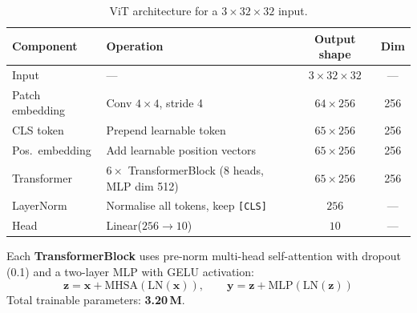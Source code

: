 \documentclass[11pt,a4paper]{article}
\begin{document}
\begin{table}[H]
\centering
\caption{ViT architecture for a $3\times32\times32$ input.}
\label{tab:vit_arch}
\begin{tabular}{llcc}
\toprule
\textbf{Component} & \textbf{Operation} & \textbf{Output shape} & \textbf{Dim} \\
\midrule
Input            & ---                                   & $3\times32\times32$ & --- \\
Patch embedding  & Conv $4\times4$, stride 4             & $64\times256$       & 256 \\
CLS token        & Prepend learnable token               & $65\times256$       & 256 \\
Pos.\ embedding  & Add learnable position vectors        & $65\times256$       & 256 \\
Transformer      & $6\times$ TransformerBlock (8 heads, MLP dim 512) & $65\times256$ & 256 \\
LayerNorm        & Normalise all tokens, keep \texttt{[CLS]} & $256$               & --- \\
Head             & Linear($256\to10$)                    & $10$                & --- \\
\bottomrule
\end{tabular}
\end{table}

Each \textbf{TransformerBlock} uses pre-norm multi-head self-attention with dropout (0.1)
and a two-layer MLP with GELU activation:
\[
\mathbf{z} = \mathbf{x} + \text{MHSA}(\text{LN}(\mathbf{x})), \qquad
\mathbf{y} = \mathbf{z} + \text{MLP}(\text{LN}(\mathbf{z}))
\]
Total trainable parameters: \textbf{3.20\,M}.
\end{document}

